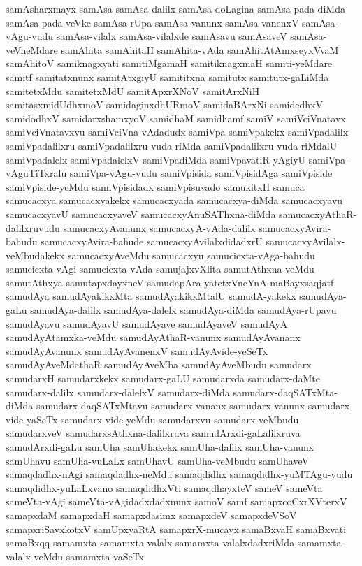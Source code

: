 {samAsharxmayx
samAsa
samAsa-dalilx
samAsa-doLagina
samAsa-pada-diMda
samAsa-pada-veVke
samAsa-rUpa
samAsa-vanunx
samAsa-vanenxV
samAsa-vAgu-vudu
samAsa-vilalx
samAsa-vilalxde
samAsavu
samAsaveV
samAsa-veVneMdare
samAhita
samAhitaH
samAhita-vAda
samAhitAtAmxseyxVvaM
samAhitoV
samiknagxyati
samitiMgamaH
samitiknagxmaH
samiti-yeMdare
samitf
samitatxnunx
samitAtxgiyU
samititxna
samitutx
samitutx-gaLiMda
samitetxMdu
samitetxMdU
samitApxrXNoV
samitArxNiH
samitasxmidUdhxmoV
samidaginxdhURmoV
samidaBArxNi
samidedhxV
samidodhxV
samidarxshamxyoV
samidhaM
samidhamf
samiV
samiVciVnatavx
samiVciVnatavxvu
samiVciVna-vAdadudx
samiVpa
samiVpakekx
samiVpadalilx
samiVpadalilxru
samiVpadalilxru-vuda-riMda
samiVpadalilxru-vuda-riMdalU
samiVpadalelx
samiVpadalelxV
samiVpadiMda
samiVpavatiR-yAgiyU
samiVpa-vAguTiTxralu
samiVpa-vAgu-vudu
samiVpisida
samiVpisidAga
samiVpiside
samiVpiside-yeMdu
samiVpisidadx
samiVpisuvado
samukitxH
samuca
samucacxya
samucacxyakekx
samucacxyada
samucacxya-diMda
samucacxyavu
samucacxyavU
samucacxyaveV
samucacxyAnuSAThxna-diMda
samucacxyAthaR-dalilxruvudu
samucacxyAvanunx
samucacxyA-vAda-dalilx
samucacxyAvira-bahudu
samucacxyAvira-bahude
samucacxyAvilalxdidadxrU
samucacxyAvilalx-veMbudakekx
samucacxyAveMdu
samucacxyu
samucicxta-vAga-bahudu
samucicxta-vAgi
samucicxta-vAda
samujajxvXlita
samutAthxna-veMdu
samutAthxya
samutapxdayxneV
samudapAra-yatetxVneYnA-maBayxsaqjatf
samudAya
samudAyakikxMta
samudAyakikxMtalU
samudA-yakekx
samudAya-gaLu
samudAya-dalilx
samudAya-dalelx
samudAya-diMda
samudAya-rUpavu
samudAyavu
samudAyavU
samudAyave
samudAyaveV
samudAyA
samudAyAtamxka-veMdu
samudAyAthaR-vanunx
samudAyAvananx
samudAyAvanunx
samudAyAvanenxV
samudAyAvide-yeSeTx
samudAyAveMdathaR
samudAyAveMba
samudAyAveMbudu
samudarx
samudarxH
samudarxkekx
samudarx-gaLU
samudarxda
samudarx-daMte
samudarx-dalilx
samudarx-dalelxV
samudarx-diMda
samudarx-daqSATxMta-diMda
samudarx-daqSATxMtavu
samudarx-vananx
samudarx-vanunx
samudarx-vide-yaSeTx
samudarx-vide-yeMdu
samudarxvu
samudarx-veMbudu
samudarxveV
samudarxsAthxna-dalilxruva
samudArxdi-gaLalilxruva
samudArxdi-gaLu
samUha
samUhakekx
samUha-dalilx
samUha-vanunx
samUhavu
samUha-vuLaLx
samUhavU
samUha-veMbudu
samUhaveV
samaqdadhx-nAgi
samaqdadhx-neMdu
samaqdidhx
samaqdidhx-yuMTAgu-vudu
samaqdidhx-yuLaLxvano
samaqdidhxVti
samaqdhayxteV
sameV
sameVta
sameVta-vAgi
sameVta-vAgidadxdadxnunx
samoV
samf
samapxcoCxrXVterxV
samapxdaM
samapxdaH
samapxdasimx
samapxdeV
samapxdeVSoV
samapxriSavxkotxV
samUpxyaRtA
samapxrX-mucayx
samaBxvaH
samaBxvati
samaBxqq
samamxta
samamxta-valalx
samamxta-valalxdadxriMda
samamxta-valalx-veMdu
samamxta-vaSeTx
}
